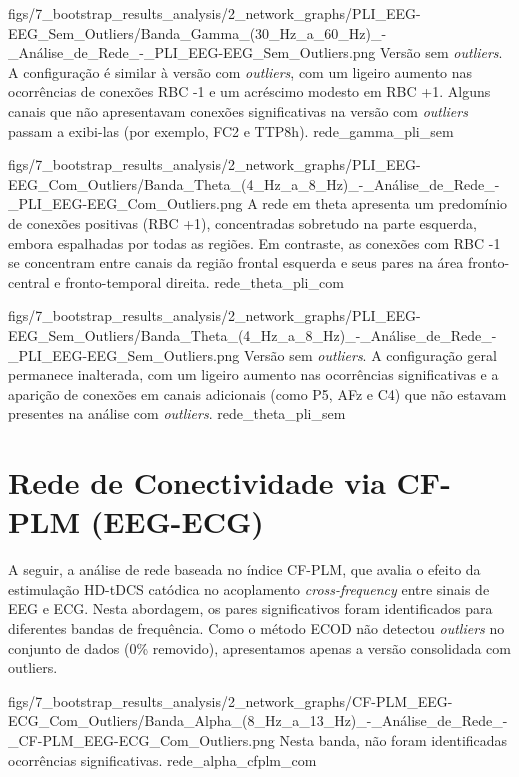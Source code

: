 \ultrawidefigure
{figs/7_bootstrap_results_analysis/2_network_graphs/PLI_EEG-EEG_Sem_Outliers/Banda_Gamma_(30_Hz_a_60_Hz)_-_Análise_de_Rede_-_PLI_EEG-EEG_Sem_Outliers.png}
{Versão sem \textit{outliers}. A configuração é similar à versão com \textit{outliers}, com um ligeiro aumento nas ocorrências de conexões RBC -1 e um acréscimo modesto em RBC +1. Alguns canais que não apresentavam conexões significativas na versão com \textit{outliers} passam a exibi-las (por exemplo, FC2 e TTP8h).}
{rede_gamma_pli_sem}

\ultrawidefigure
{figs/7_bootstrap_results_analysis/2_network_graphs/PLI_EEG-EEG_Com_Outliers/Banda_Theta_(4_Hz_a_8_Hz)_-_Análise_de_Rede_-_PLI_EEG-EEG_Com_Outliers.png}
{A rede em theta apresenta um predomínio de conexões positivas (RBC +1), concentradas sobretudo na parte esquerda, embora espalhadas por todas as regiões. Em contraste, as conexões com RBC -1 se concentram entre canais da região frontal esquerda e seus pares na área fronto-central e fronto-temporal direita.}
{rede_theta_pli_com}

\ultrawidefigure
{figs/7_bootstrap_results_analysis/2_network_graphs/PLI_EEG-EEG_Sem_Outliers/Banda_Theta_(4_Hz_a_8_Hz)_-_Análise_de_Rede_-_PLI_EEG-EEG_Sem_Outliers.png}
{Versão sem \textit{outliers}. A configuração geral permanece inalterada, com um ligeiro aumento nas ocorrências significativas e a aparição de conexões em canais adicionais (como P5, AFz e C4) que não estavam presentes na análise com \textit{outliers}.}
{rede_theta_pli_sem}


\section{Rede de Conectividade via CF-PLM (EEG-ECG)}
A seguir, a análise de rede baseada no índice CF-PLM, que avalia o efeito da estimulação HD-tDCS catódica no acoplamento \textit{cross-frequency} entre sinais de EEG e ECG. Nesta abordagem, os pares significativos foram identificados para diferentes bandas de frequência. Como o método ECOD não detectou \textit{outliers} no conjunto de dados (0\% removido), apresentamos apenas a versão consolidada com outliers.

\ultrawidefigure
{figs/7_bootstrap_results_analysis/2_network_graphs/CF-PLM_EEG-ECG_Com_Outliers/Banda_Alpha_(8_Hz_a_13_Hz)_-_Análise_de_Rede_-_CF-PLM_EEG-ECG_Com_Outliers.png}
{Nesta banda, não foram identificadas ocorrências significativas.}
{rede_alpha_cfplm_com}

